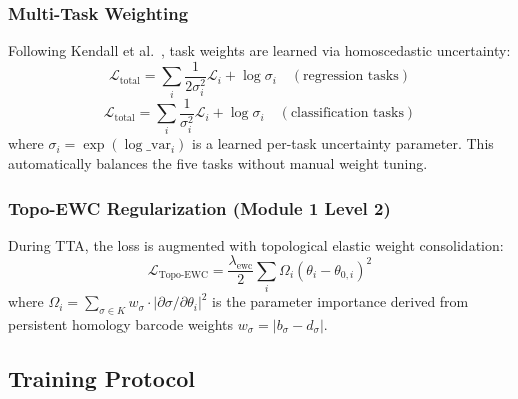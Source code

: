 \subsubsection{Multi-Task Weighting}

Following Kendall et al.~\cite{kendall2018multi}, task weights are learned
via homoscedastic uncertainty:
\begin{equation}
    \mathcal{L}_{\text{total}} = \sum_{i} \frac{1}{2\sigma_i^2}\mathcal{L}_i
    + \log\sigma_i \quad (\text{regression tasks})
\end{equation}
\begin{equation}
    \mathcal{L}_{\text{total}} = \sum_{i} \frac{1}{\sigma_i^2}\mathcal{L}_i
    + \log\sigma_i \quad (\text{classification tasks})
\end{equation}
where $\sigma_i = \exp(\log\_\text{var}_i)$ is a learned per-task uncertainty
parameter. This automatically balances the five tasks without manual weight tuning.

\subsubsection{Topo-EWC Regularization (Module 1 Level 2)}

During TTA, the loss is augmented with topological elastic weight consolidation:
\begin{equation}
    \mathcal{L}_{\text{Topo-EWC}} = \frac{\lambda_{\text{ewc}}}{2}
    \sum_i \Omega_i (\theta_i - \theta_{0,i})^2
\end{equation}
where $\Omega_i = \sum_{\sigma \in K} w_\sigma \cdot |\partial\sigma/\partial\theta_i|^2$
is the parameter importance derived from persistent homology barcode weights
$w_\sigma = |b_\sigma - d_\sigma|$.

\subsection{Training Protocol}


